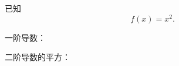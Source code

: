 \documentclass[a5paper,12pt]{ctexart}
\begin{document}
已知  \[
    f(x) = x^2.
\] 

一阶导数： 

二阶导数的平方：
\end{document}
